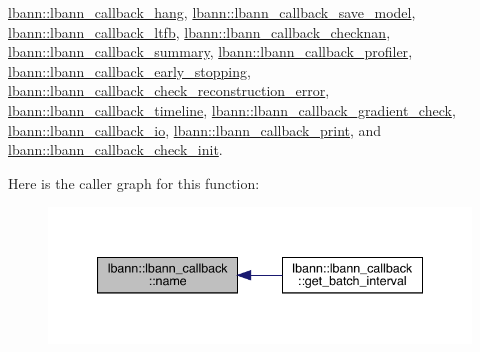 \hyperlink{classlbann_1_1lbann__callback__hang_a3aa4a28d16f21dd6bd86fd6ebaa0e0fa}{lbann\+::lbann\+\_\+callback\+\_\+hang}, \hyperlink{classlbann_1_1lbann__callback__save__model_a85b88992e7cd7073279b8a9b6d8b142f}{lbann\+::lbann\+\_\+callback\+\_\+save\+\_\+model}, \hyperlink{classlbann_1_1lbann__callback__ltfb_aaf259b187e956282807d4daa03beb502}{lbann\+::lbann\+\_\+callback\+\_\+ltfb}, \hyperlink{classlbann_1_1lbann__callback__checknan_ab42c997a06058c3535792408fdd5fed8}{lbann\+::lbann\+\_\+callback\+\_\+checknan}, \hyperlink{classlbann_1_1lbann__callback__summary_a79814488c1ed0123b335a4cd1a236724}{lbann\+::lbann\+\_\+callback\+\_\+summary}, \hyperlink{classlbann_1_1lbann__callback__profiler_ac58447afa0642c1a466d9b58f0de87c8}{lbann\+::lbann\+\_\+callback\+\_\+profiler}, \hyperlink{classlbann_1_1lbann__callback__early__stopping_a3fce0ab7696bc24dd9b3330815c5a495}{lbann\+::lbann\+\_\+callback\+\_\+early\+\_\+stopping}, \hyperlink{classlbann_1_1lbann__callback__check__reconstruction__error_a604bb361e11774cb5d047d65a5d6508e}{lbann\+::lbann\+\_\+callback\+\_\+check\+\_\+reconstruction\+\_\+error}, \hyperlink{classlbann_1_1lbann__callback__timeline_aaede0408ae30a3c82f567981e374a224}{lbann\+::lbann\+\_\+callback\+\_\+timeline}, \hyperlink{classlbann_1_1lbann__callback__gradient__check_ad068bba7a10853f38cc9f58867dc468b}{lbann\+::lbann\+\_\+callback\+\_\+gradient\+\_\+check}, \hyperlink{classlbann_1_1lbann__callback__io_ac0b1327364b2ae3c7b7e4987aef70e33}{lbann\+::lbann\+\_\+callback\+\_\+io}, \hyperlink{classlbann_1_1lbann__callback__print_a212640539d73eec3317572150a11b71b}{lbann\+::lbann\+\_\+callback\+\_\+print}, and \hyperlink{classlbann_1_1lbann__callback__check__init_a4f8507c26f8e467697fef29ab8463b0f}{lbann\+::lbann\+\_\+callback\+\_\+check\+\_\+init}.

Here is the caller graph for this function\+:\nopagebreak
\begin{figure}[H]
\begin{center}
\leavevmode
\includegraphics[width=340pt]{classlbann_1_1lbann__callback_a7522c7a14f1d6a1ea762cc2d7248eb3a_icgraph}
\end{center}
\end{figure}
\mbox{\label{classlbann_1_1lbann__callback_a2c0709a26179d115ff85b7561786ee27}} 
